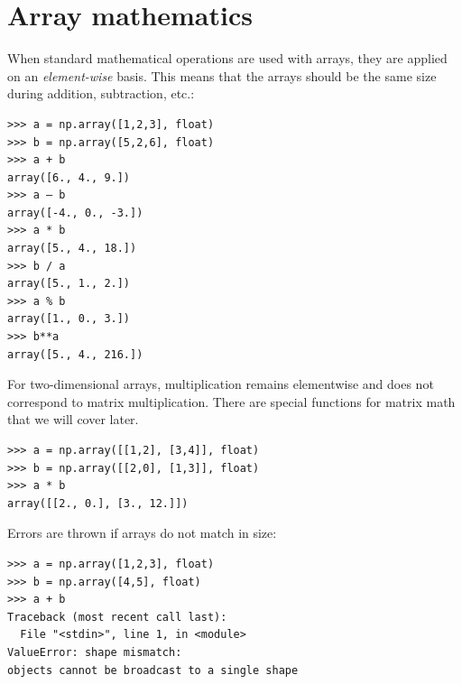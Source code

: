 \documentclass[12pt]{article}
\begin{document}
\section{Array mathematics }
When standard mathematical operations are used with arrays, they are applied on an \textit{element-wise} basis. This means that the arrays should be the same size during addition, subtraction, etc.:
\footnotesize
\begin{Verbatim}[frame=single] 
>>> a = np.array([1,2,3], float) 
>>> b = np.array([5,2,6], float) 
>>> a + b 
array([6., 4., 9.]) 
>>> a – b 
array([-4., 0., -3.]) 
>>> a * b 
array([5., 4., 18.]) 
>>> b / a 
array([5., 1., 2.]) 
>>> a % b 
array([1., 0., 3.]) 
>>> b**a 
array([5., 4., 216.]) 
\end{Verbatim}
\normalsize
For two-dimensional arrays, multiplication remains elementwise and does not correspond to 
matrix multiplication. There are special functions for matrix math that we will cover later. 
\footnotesize
\begin{Verbatim}[frame=single]
>>> a = np.array([[1,2], [3,4]], float) 
>>> b = np.array([[2,0], [1,3]], float) 
>>> a * b 
array([[2., 0.], [3., 12.]]) 
\end{Verbatim}
\normalsize
Errors are thrown if arrays do not match in size:
\footnotesize
\begin{Verbatim}[frame=single]
>>> a = np.array([1,2,3], float) 
>>> b = np.array([4,5], float) 
>>> a + b
Traceback (most recent call last): 
  File "<stdin>", line 1, in <module> 
ValueError: shape mismatch: 
objects cannot be broadcast to a single shape
\end{Verbatim}
\normalsize
\end{document}
